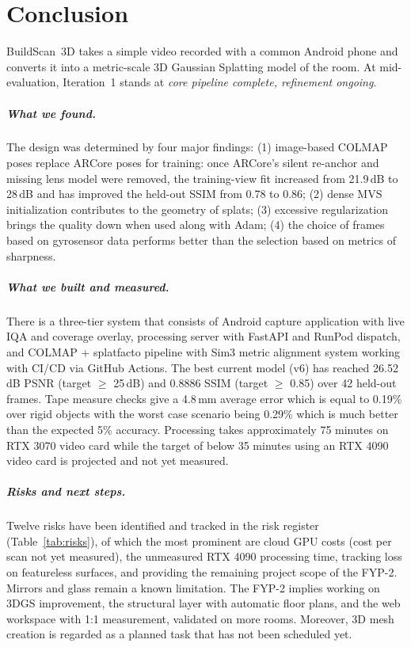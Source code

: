 \chapter{Conclusion}

BuildScan~3D takes a simple video recorded with a common Android phone and converts it into a metric-scale 3D Gaussian Splatting model of the room. At mid-evaluation, Iteration~1 stands at \emph{core pipeline complete, refinement ongoing}.

\paragraph{What we found.} The design was determined by four major findings: (1) image-based COLMAP poses replace ARCore poses for training: once ARCore's silent re-anchor and missing lens model were removed, the training-view fit increased from 21.9\,dB to 28\,dB and has improved the held-out SSIM from 0.78 to 0.86; (2) dense MVS initialization contributes to the geometry of splats; (3) excessive regularization brings the quality down when used along with Adam; (4) the choice of frames based on gyrosensor data performs better than the selection based on metrics of sharpness.

\paragraph{What we built and measured.} There is a three-tier system that consists of Android capture application with live IQA and coverage overlay, processing server with FastAPI and RunPod dispatch, and COLMAP + splatfacto pipeline with Sim3 metric alignment system working with CI/CD via GitHub Actions. The best current model (v6) has reached 26.52\,dB PSNR (target $\geq$ 25\,dB) and 0.8886 SSIM (target $\geq$ 0.85) over 42 held-out frames. Tape measure checks give a 4.8\,mm average error which is equal to 0.19\% over rigid objects with the worst case scenario being 0.29\% which is much better than the expected 5\% accuracy. Processing takes approximately 75 minutes on RTX 3070 video card while the target of below 35 minutes using an RTX 4090 video card is projected and not yet measured.

\paragraph{Risks and next steps.} Twelve risks have been identified and tracked in the risk register (Table~\ref{tab:risks}), of which the most prominent are cloud GPU costs (cost per scan not yet measured), the unmeasured RTX 4090 processing time, tracking loss on featureless surfaces, and providing the remaining project scope of the FYP-2. Mirrors and glass remain a known limitation. The FYP-2 implies working on 3DGS improvement, the structural layer with automatic floor plans, and the web workspace with 1:1 measurement, validated on more rooms. Moreover, 3D mesh creation is regarded as a planned task that has not been scheduled yet.
